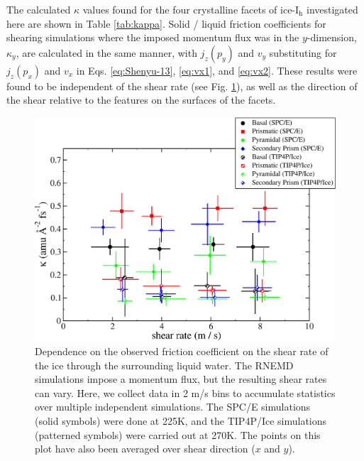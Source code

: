 The calculated $\kappa$ values found for the four crystalline facets
of ice-I$_\mathrm{h}$ investigated here are shown in Table
\ref{tab:kappa}. Solid / liquid friction coefficients for shearing
simulations where the imposed momentum flux was in the $y$-dimension,
$\kappa_{y}$, are calculated in the same manner, with $j_{z}(p_{y})$
and $v_{y}$ substituting for $j_{z}(p_{x})$ and $v_{x}$ in
Eqs. \eqref{eq:Shenyu-13}, \eqref{eq:vx1}, and \eqref{eq:vx2}.  These
results were found to be independent of the shear rate (see
Fig. \ref{fig:kappaPlot}), as well as the direction of the shear
relative to the features on the surfaces of the facets.


\begin{figure}
\includegraphics[width=\linewidth]{Figures/kappaPlot2}
\caption{\label{fig:kappaPlot} Dependence on the observed friction
  coefficient on the shear rate of the ice through the surrounding
  liquid water.  The RNEMD simulations impose a momentum flux, but the
  resulting shear rates can vary.  Here, we collect data in 2 m/s bins
  to accumulate statistics over multiple independent simulations.  The
  SPC/E simulations (solid symbols) were done at 225K, and the
  TIP4P/Ice simulations (patterned symbols) were carried out at
  270K. The points on this plot have also been averaged over shear
  direction ($x$ and $y$).}
\end{figure}


